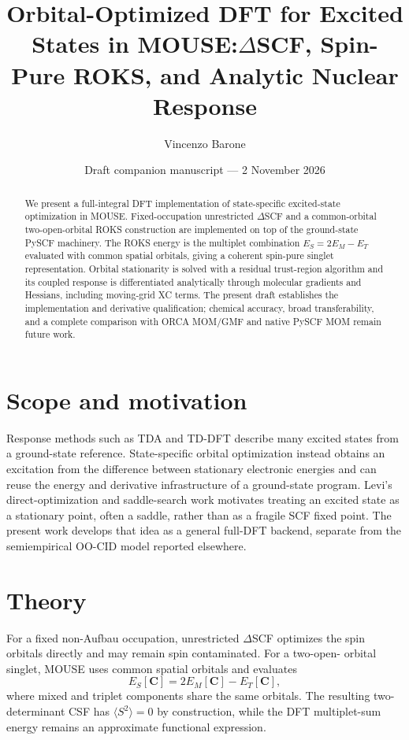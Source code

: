 \documentclass[11pt,a4paper]{article}
\title{Orbital-Optimized DFT for Excited States in MOUSE:$\Delta$SCF, Spin-Pure ROKS, and Analytic Nuclear Response}
\author{Vincenzo Barone}
\date{Draft companion manuscript --- 2 November 2026}
\begin{document}
\maketitle

\begin{abstract}
We present a full-integral DFT implementation of state-specific excited-state
optimization in MOUSE. Fixed-occupation unrestricted $\Delta$SCF and a
common-orbital two-open-orbital ROKS construction are implemented on top of
the ground-state PySCF machinery. The ROKS energy is the multiplet combination
$E_S=2E_M-E_T$ evaluated with common spatial orbitals, giving a coherent
spin-pure singlet representation. Orbital stationarity is solved with a
residual trust-region algorithm and its coupled response is differentiated
analytically through molecular gradients and Hessians, including moving-grid
XC terms. The present draft establishes the implementation and derivative
qualification; chemical accuracy, broad transferability, and a complete
comparison with ORCA MOM/GMF and native PySCF MOM remain future work.
\end{abstract}

\section{Scope and motivation}
Response methods such as TDA and TD-DFT describe many excited states from a
ground-state reference. State-specific orbital optimization instead obtains an
excitation from the difference between stationary electronic energies and can
reuse the energy and derivative infrastructure of a ground-state program.
Levi's direct-optimization and saddle-search work motivates treating an
excited state as a stationary point, often a saddle, rather than as a fragile
SCF fixed point. The present work develops that idea as a general full-DFT
backend, separate from the semiempirical OO-CID model reported elsewhere.

\section{Theory}
For a fixed non-Aufbau occupation, unrestricted $\Delta$SCF optimizes the
spin orbitals directly and may remain spin contaminated. For a two-open-
orbital singlet, MOUSE uses common spatial orbitals and evaluates
\begin{equation}
 E_S[\mathbf C]=2E_M[\mathbf C]-E_T[\mathbf C],
\end{equation}
where mixed and triplet components share the same orbitals. The resulting
two-determinant CSF has $\langle S^2\rangle=0$ by construction, while the
DFT multiplet-sum energy remains an approximate functional expression.
\end{document}
